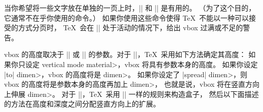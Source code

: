 当你希望将一些文字放在单独的一页上时，|\vtop| 和 |\vbox| 是有用的。%
（为了这个目的，它通常不在乎你使用的命令。）%
如果你使用这些命令使得 \TeX\ 不能以一种可以接受的方式分页时，
\TeX\ 会在 |\output| 处于活动的情况下，给出 vbox 过满或不足的警告。

vbox 的高度取决于 |\vtop| 或 |\vbox| 的参数。对于 |\vbox|，\TeX\ 采用如下方法确定其高度：
\ulist\compact
\li 如果你只设定 \<vertical mode material>，vbox 将具有参数本身的高度。
\li 如果你设定 |to| \<dimen>，vbox 的高度将是 \<dimen>。
\li 如果你设定了 |spread| \<dimen>，则 vbox 的高度将是参数本身的高度再加上 \<dimen>，
也就是说，vbox 将在竖直方向上伸展 \<dimen>。
\endulist
\noindent
对于 |\vtop|，\TeX\ 采用 |\vbox| 一样的规则来构造盒子，
然后以下面描述的方法在高度和深度之间分配竖直方向上的扩展。

